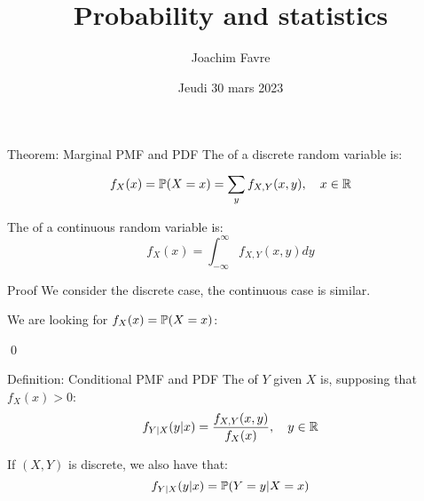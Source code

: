 \documentclass[a4paper]{article}
\title{Probability and statistics}
\author{Joachim Favre}
\date{Jeudi 30 mars 2023}
\begin{document}
\maketitle


\begin{parag}{Theorem: Marginal PMF and PDF}
    The  of a discrete random variable is: 
    \[f_X\left(x\right) = \prob\left(X = x\right) = \sum_{y}^{} f_{X, Y}\left(x, y\right), \mathspace x \in \mathbb{R}\]
    
    The  of a continuous random variable is: 
    \[f_X\left(x\right) = \int_{-\infty}^{\infty} f_{X, Y}\left(x, y\right)dy\]
    
    \begin{subparag}{Proof}
        We consider the discrete case, the continuous case is similar.

        We are looking for $f_X\left(x\right) = \prob\left(X = x\right)$: 

        \qed
    \end{subparag}
\end{parag}

\begin{parag}{Definition: Conditional PMF and PDF}
    The  of $Y$ given $X$ is, supposing that $f_X\left(x\right) > 0$: 
    \[f_{Y|X}\left(y|x\right) = \frac{f_{X, Y}\left(x, y\right)}{f_X\left(x\right)}, \mathspace y \in \mathbb{R}\]
    
    If $\left(X, Y\right)$ is discrete, we also have that: 
    \[f_{Y|X}\left(y|x\right) = \prob\left(Y = y | X = x\right)\]
\end{parag}
\end{document}
